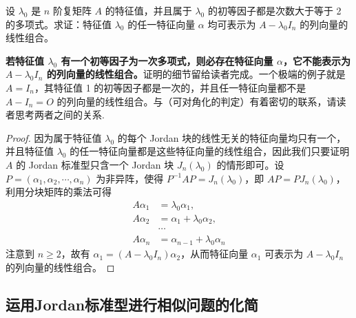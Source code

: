 \documentclass[../../main.tex]{subfiles}%
\begin{document}
\begin{proposition}\label{proposition:列向量的线性组合}
设 $\lambda_0$ 是 $n$ 阶复矩阵 $A$ 的特征值，并且属于 $\lambda_0$ 的初等因子都是次数大于等于 2 的多项式。求证：特征值 $\lambda_0$ 的任一特征向量 $\alpha$ 均可表示为 $A - \lambda_0I_n$ 的列向量的线性组合。
\end{proposition}
\begin{remark}
\textbf{若特征值 $\lambda_0$ 有一个初等因子为一次多项式，则必存在特征向量 $\alpha$，它不能表示为 $A - \lambda_0I_n$ 的列向量的线性组合。}证明的细节留给读者完成。一个极端的例子就是 $A = I_n$，其特征值 1 的初等因子都是一次的，并且任一特征向量都不是 $A - I_n = O$ 的列向量的线性组合。与（可对角化的判定）有着密切的联系，请读者思考两者之间的关系.
\end{remark}
\begin{proof}

因为属于特征值 $\lambda_0$ 的每个 Jordan 块的线性无关的特征向量均只有一个，并且特征值 $\lambda_0$ 的任一特征向量都是这些特征向量的线性组合，因此我们只要证明 $A$ 的 Jordan 标准型只含一个 Jordan 块 $J_n(\lambda_0)$ 的情形即可。设 $P = (\alpha_1,\alpha_2,\cdots,\alpha_n)$ 为非异阵，使得 $P^{-1}AP = J_n(\lambda_0)$，即 $AP = PJ_n(\lambda_0)$，利用分块矩阵的乘法可得
\begin{align*}
A\alpha_1 &= \lambda_0\alpha_1,\\
A\alpha_2 &= \alpha_1 + \lambda_0\alpha_2,\\
&\cdots\\
A\alpha_n &= \alpha_{n - 1} + \lambda_0\alpha_n
\end{align*}
注意到 $n \geqslant  2$，故有 $\alpha_1 = (A - \lambda_0I_n)\alpha_2$，从而特征向量 $\alpha_1$ 可表示为 $A - \lambda_0I_n$ 的列向量的线性组合。

\end{proof}



\subsection{运用Jordan标准型进行相似问题的化简}
\end{document}
